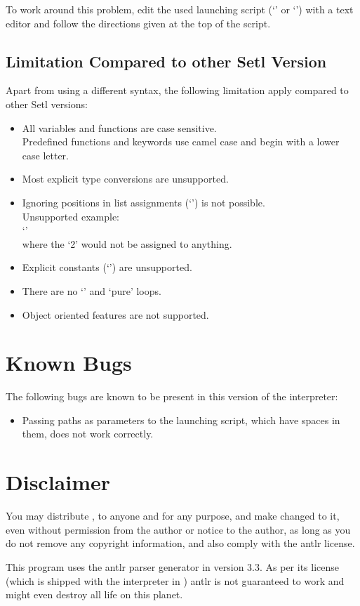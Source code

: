To work around this problem, edit the used launching script (`' or `') with a text editor and follow the directions given at the top of the script.

\subsection{Limitation Compared to other Setl Version}

Apart from using a different syntax, the following limitation apply compared to other Setl versions:

\begin{itemize}
	\item All variables and functions are case sensitive.\\
        Predefined functions and keywords use camel case and begin with a lower case letter.
    \item Most explicit type conversions are unsupported.
    \item Ignoring positions in list assignments (`\command{-}') is not possible.\\
        Unsupported example:\\
        `\command{[x,-,y] := [1,2,3];}'\\
        where the `2' would not be assigned to anything.
    \item Explicit constants (`') are unsupported.
    \item There are no `' and `pure' loops.
    \item Object oriented features are not supported.
\end{itemize}

\section{Known Bugs}
The following bugs are known to be present in this version of the interpreter:

\begin{itemize}
	\item Passing paths as parameters to the \setlX{} launching script, which have spaces in them, does not work correctly.
\end{itemize}


\section{Disclaimer}
You may distribute \setlX{}, to anyone and for any purpose, and make changed to it, even without permission from the author or notice to the author, as long as you do not remove any copyright information, and also comply with the antlr license.

This program uses the antlr parser generator in version 3.3. As per its license (which is shipped with the interpreter in ) antlr is not guaranteed to work and might even destroy all life on this planet.


